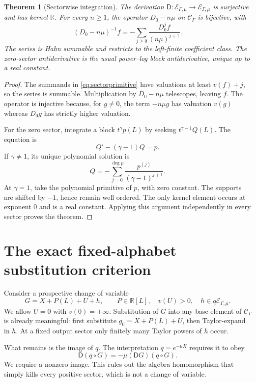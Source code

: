 \documentclass[11pt,a4paper]{article}
\newtheorem{theorem}{Theorem}[section]
\theoremstyle{definition}
\theoremstyle{remark}
\newcommand{\R}{\mathbb R}
\newcommand{\C}{\mathcal C_\Gamma}
\newcommand{\E}{\mathcal E_{\Gamma,\mu}}
\newcommand{\D}{\mathsf D}
\begin{document}
\begin{theorem}[Sectorwise integration]\label{thm:integration}
The derivation $\D:\E\to\E$ is surjective and has kernel $\R$.
For every $n\ge1$, the operator $D_0-n\mu$ on $\C$ is bijective, with
\begin{equation}\label{eq:sectorprimitive}
 (D_0-n\mu)^{-1}f
 =-\sum_{j\ge0}\frac{D_0^j f}{(n\mu)^{j+1}}.
\end{equation}
The series is Hahn summable and restricts to the left-finite coefficient
class. The zero-sector antiderivative is the usual power--log block
antiderivative, unique up to a real constant.
\end{theorem}
\begin{proof}
The summands in \eqref{eq:sectorprimitive} have valuations at least
$v(f)+j$, so the series is summable. Multiplication by $D_0-n\mu$ telescopes,
leaving $f$. The operator is injective because, for $g\ne0$, the term
$-n\mu g$ has valuation $v(g)$ whereas $D_0g$ has strictly higher valuation.

For the zero sector, integrate a block $t^\gamma p(L)$ by seeking
$t^{\gamma-1}Q(L)$. The equation is
\[
 Q'-(\gamma-1)Q=p.
\]
If $\gamma\ne1$, its unique polynomial solution is
\[
 Q=-\sum_{j=0}^{\deg p}\frac{p^{(j)}}{(\gamma-1)^{j+1}}.
\]
At $\gamma=1$, take the polynomial primitive of $p$, with zero constant.
The supports are shifted by $-1$, hence remain well ordered. The only
kernel element occurs at exponent $0$ and is a real constant. Applying this
argument independently in every sector proves the theorem.
\end{proof}

\section{The exact fixed-alphabet substitution criterion}
\label{sec:classification}

Consider a prospective change of variable
\begin{equation}\label{eq:Gform}
 G=X+P(L)+U+h,\qquad P\in\R[L],\quad v(U)>0,\quad h\in q\E.
\end{equation}
We allow $U=0$ with $v(0)=+\infty$. Substitution of $G$ into any base element
of $\C$ is already meaningful: first substitute
$g_0=X+P(L)+U$, then Taylor-expand in $h$. At a fixed output sector only
finitely many Taylor powers of $h$ occur.

What remains is the image of $q$. The interpretation $q=e^{-\mu X}$
requires it to obey
\begin{equation}\label{eq:qchain}
 \D(q\circ G)=-\mu(\D G)(q\circ G).
\end{equation}
We require a nonzero image. This rules out the algebra homomorphism that
simply kills every positive sector, which is not a change of variable.
\end{document}
